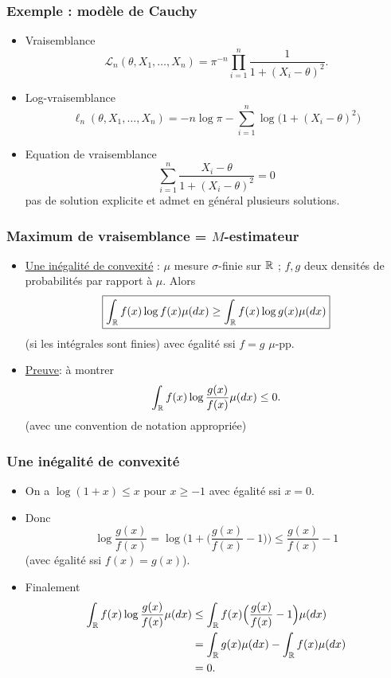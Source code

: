 \begin{frame}
\frametitle{Exemple : mod\`ele de Cauchy}
\begin{itemize}
\item \alert{Vraisemblance}
$${\mathcal L}_n(\theta, X_1,\ldots, X_n) = \pi^{-n} \prod_{i =1}^n \frac{1}{1+(X_i-\theta)^2}.$$
\item \alert{Log-vraisemblance}
$$\ell_n(\theta,X_1,\ldots, X_n) = -n\log \pi -\sum_{i = 1}^n \log\big(1+(X_i-\theta)^2\big)$$
\item \alert{Equation de vraisemblance}
$$\boxed{\sum_{i = 1}^n \frac{X_i-\theta}{1+(X_i-\theta)^2}=0}$$
pas de solution explicite et admet en général plusieurs solutions.
\end{itemize}
\end{frame}


\begin{frame}
\frametitle{Maximum de vraisemblance = $M$-estimateur}
\begin{itemize}
\item \underline{Une inégalité de convexité} : $\mu$ mesure $\sigma$-finie sur $\operatorname{{\mathbb R}}$ ; $f,g$ deux \alert{densités de probabilités} par rapport à $\mu$. Alors
$$\boxed{\int_{\operatorname{{\mathbb R}}}f(x)\log f(x) \mu(dx) \geq \int_{\operatorname{{\mathbb R}}} f(x) \log g(x) \mu(dx)}$$
(si les intégrales sont finies) avec égalité \alert{ssi} $f=g$ $\mu$-pp.
\item \underline{Preuve}: à montrer
$$\int_{\operatorname{{\mathbb R}}} f(x) \log \frac{g(x)}{f(x)}\mu(dx) \leq 0.$$
(avec une convention de notation appropriée)
\end{itemize}
\end{frame}

\begin{frame}
\frametitle{Une inégalité de convexité}
\begin{itemize}
\item On a $\log(1+x)\leq x$ pour $x \geq -1$ avec égalité ssi $x=0$.
\item Donc
$$\log \frac{g(x)}{f(x)} = \log\Big(1+\big(\frac{g(x)}{f(x)}-1\big)\Big) \leq \frac{g(x)}{f(x)}-1$$
(avec égalité ssi $f(x)=g(x)$).
\item Finalement
\begin{align*}
\int_{\operatorname{{\mathbb R}}}f(x)\log \frac{g(x)}{f(x)}\mu(dx)& \leq \int_{\operatorname{{\mathbb R}}} f(x)\Big(\frac{g(x)}{f(x)}-1\Big)\mu(dx) \\
& = \int_{\operatorname{{\mathbb R}}} g(x)\mu(dx)- \int_{\operatorname{{\mathbb R}}}f(x) \mu(dx)\\
&=0.
\end{align*}
\end{itemize}
\end{frame}

